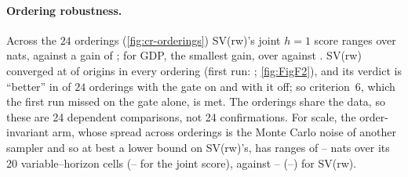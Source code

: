 \paragraph{Ordering robustness.}
Across the $24$ orderings (\cref{fig:cr-orderings}) SV(rw)'s joint $h = 1$ score ranges over
 nats, against a gain of
; for GDP, the smallest gain, over
 against
. %
SV(rw) converged at  of origins in every ordering
(first run: ; \cref{fig:FigF2}), and its verdict is ``better'' in
 of $24$ orderings with the gate on and
 with it off; so criterion~6,
which the first run missed on the gate alone, is met. The orderings share the data, so these are
24 dependent comparisons, not 24 confirmations. %
For scale, the order-invariant  arm, whose spread across orderings is the Monte Carlo
noise of another sampler and so at best a lower bound on SV(rw)'s, has ranges of
--
nats over its 20 variable--horizon cells
(--
for the joint score), against
--
(--)
for SV(rw). %
